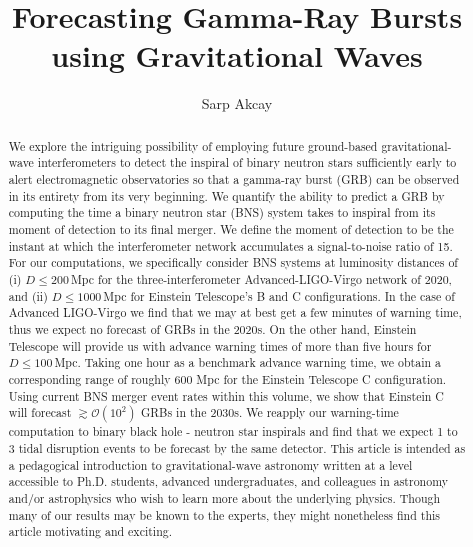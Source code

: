 \documentclass[prd,amsmath,amssymb,aps,floats,amsfonts,notitlepage,superscriptaddress,eqsecnum,nofootinbib,10pt]{revtex4-1}
\newcommand{\ord}{\mathcal{O}}
\begin{document}
\title{Forecasting Gamma-Ray Bursts using Gravitational Waves}

\author{Sarp Akcay}

\begin{abstract}
We explore the intriguing possibility of employing future ground-based gravitational-wave interferometers to detect the inspiral of binary neutron stars sufficiently
early to alert electromagnetic observatories so that a gamma-ray burst (GRB) can be observed in its entirety from its very beginning.
We quantify the ability to predict a GRB by computing the time a binary neutron star (BNS) system takes to inspiral from its moment of detection to its final merger. We define the moment of detection to be the instant at which the interferometer network accumulates a signal-to-noise ratio of 15. %
For our computations, %
we specifically consider BNS systems at luminosity distances of (i) $D\le200\,$Mpc for the three-interferometer Advanced-LIGO-Virgo network of 2020, and (ii) $D \le 1000\,$Mpc for Einstein Telescope's B and C configurations. 
In the case of Advanced LIGO-Virgo we find that we may at best get a few minutes of warning time, thus we expect no forecast of GRBs in the 2020s. 
On the other hand, Einstein Telescope will provide us with advance warning times of more than five hours for $D \le 100\,$Mpc.
Taking one hour as a benchmark advance warning time, we obtain a corresponding range of roughly 600 Mpc for the Einstein Telescope C configuration.
Using current BNS merger event rates within this volume, we show that Einstein C will forecast $\gtrsim \ord(10^2)$ GRBs in the 2030s. %
We reapply our warning-time computation to binary black hole - neutron star inspirals and find that we expect 1 to 3 tidal disruption events 
to be forecast by the same detector.
This article is intended as a pedagogical introduction to gravitational-wave astronomy written at a level accessible to
Ph.D. students, advanced undergraduates, and colleagues in astronomy and/or astrophysics who wish to learn more about the underlying physics.
Though many of our results may be known to the experts, they might nonetheless find this article motivating and exciting.
\end{abstract}
\maketitle
\end{document}
